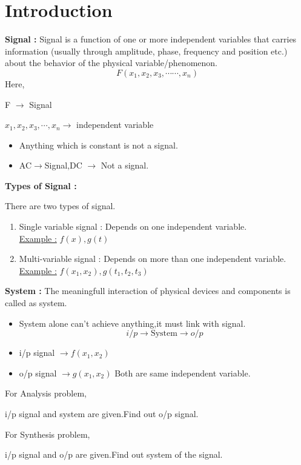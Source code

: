 \documentclass[a5paper,10pt]{report}
\begin{document}
\section{Introduction}
\textbf{Signal : }Signal is a function of one or more independent variables that
carries information (usually through amplitude, phase,
frequency and position etc.) about the behavior of the
physical variable/phenomenon.
\[
F(x_1,x_2,x_3,\cdots\cdots,x_n)
\]
Here,\par
 F $\longrightarrow$ Signal\par
$x_1,x_2,x_3,\cdots, x_n \longrightarrow$ independent variable\par
\begin{itemize}
    \item Anything which is constant is not a signal.
    \item AC$\rightarrow$Signal,DC $\rightarrow$ Not a signal.
    
\end{itemize}
\textbf{\large Types of Signal :}\par
There are two types of signal.
\begin{enumerate}
    \item [(i)]Single variable signal : Depends on one independent variable.\\
\underline{Example :} $f(x),g(t)$
\item[(ii)] Multi-variable signal : Depends on more than one independent variable.\\
\underline{Example :} $f(x_1,x_2),g(t_1,t_2,t_3)$

\end{enumerate}
\textbf{System :} The meaningfull interaction of physical devices and components is called as system.
\begin{itemize}
    \item System alone can't achieve anything,it must link with signal.
    $$ i/p \longrightarrow \boxed{\text{System}}\longrightarrow o/p $$
    \item i/p signal $\longrightarrow f(x_1,x_2) $\\
    \item o/p signal $\longrightarrow g(x_1,x_2) $
     Both are same independent variable.
\end{itemize}

\begin{minipage}{.45\linewidth}
    For Analysis problem, \par
    i/p signal and system are given.Find out o/p signal.

\end{minipage}\hspace{25pt}
\begin{minipage}{.45\linewidth}
    For Synthesis problem,\par
    i/p signal and o/p are given.Find out system of the signal.

\end{minipage}
\end{document}
